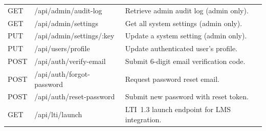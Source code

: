 \begin{longtable}{lll}
  GET  & /api/admin/audit-log       & Retrieve admin audit log (admin only). \\
  GET  & /api/admin/settings        & Get all system settings (admin only). \\
  PUT  & /api/admin/settings/:key   & Update a system setting (admin only). \\
  PUT  & /api/users/profile         & Update authenticated user's profile. \\
  POST & /api/auth/verify-email     & Submit 6-digit email verification code. \\
  POST & /api/auth/forgot-password  & Request password reset email. \\
  POST & /api/auth/reset-password   & Submit new password with reset token. \\
  GET  & /api/lti/launch            & LTI~1.3 launch endpoint for LMS integration. \\
\end{longtable}
